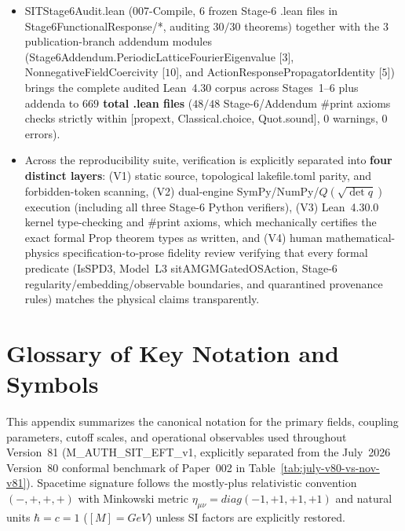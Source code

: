 \documentclass[american,11pt,letterpaper]{article}
\def\mathbb#1{#1}%
\def\mathrm#1{#1}%
\def\texttt#1{#1}%
\begin{document}
\begin{itemize}
  \item \texttt{SITStage6Audit.\allowbreak{}lean} (\texttt{007-Compile}, $6$ frozen Stage-6 \texttt{.lean} files in \texttt{Stage6FunctionalResponse/*}, auditing $30/30$ theorems) together with the $3$ publication-branch addendum modules (\texttt{Stage6Addendum.\allowbreak{}PeriodicLatticeFourierEigenvalue} [$3$], \texttt{NonnegativeFieldCoercivity} [$10$], and \texttt{ActionResponsePropagatorIdentity} [$5$]) brings the complete audited Lean~4.30 corpus across Stages~1--6 plus addenda to \textbf{$669$ total \texttt{.lean} files} ($48/48$ Stage-6/Addendum \texttt{\#print axioms} checks strictly within \texttt{[propext, Classical.\allowbreak{}choice, Quot.\allowbreak{}sound]}, \texttt{0} warnings, \texttt{0} errors).
  \item Across the reproducibility suite, verification is explicitly separated into \textbf{four distinct layers}: (V1) static source, topological \texttt{lakefile.toml} parity, and forbidden-token scanning, (V2) dual-engine SymPy/NumPy/$\mathbb{Q}(\sqrt{\det q})$ execution (including all three Stage-6 Python verifiers), (V3) Lean~4.30.0 kernel type-checking and \texttt{\#print axioms}, which mechanically certifies the exact formal \texttt{Prop} theorem types as written, and (V4) human mathematical-physics specification-to-prose fidelity review verifying that every formal predicate (\texttt{IsSPD3}, Model~L3 \texttt{sitAMGMGatedOSAction}, Stage-6 regularity/embedding/observable boundaries, and quarantined provenance rules) matches the physical claims transparently.
\end{itemize}
\appendix

\section{Glossary of Key Notation and Symbols}
\label{sec:notation}
\label{appendix:A}
\label{appendix:B}

This appendix summarizes the canonical notation for the primary fields, coupling parameters, cutoff scales, and operational observables used throughout Version~81 (\texttt{M\_AUTH\_SIT\_EFT\_v1}, explicitly separated from the July~2026 Version~80 conformal benchmark of Paper~002 in Table~\ref{tab:july-v80-vs-nov-v81}). Spacetime signature follows the mostly-plus relativistic convention $(-,+,+,+)$ with Minkowski metric $\eta_{\mu\nu} = \mathrm{diag}(-1,+1,+1,+1)$ and natural units $\hbar = c = 1$ ($[M] = \mathrm{GeV}$) unless SI factors are explicitly restored.
\end{document}
